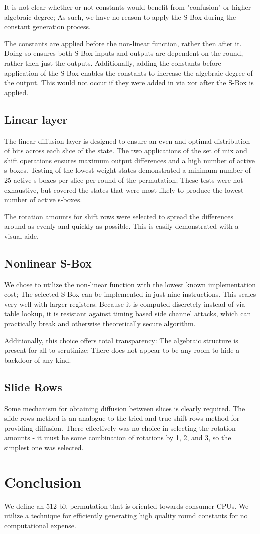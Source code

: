 \documentclass[preprint]{iacrtrans}
\begin{document}
It is not clear whether or not constants would  benefit from "confusion" or higher algebraic degree; As such, we have no reason to apply the S-Box during the constant generation process.

The constants are applied before the non-linear function, rather then after it. Doing so ensures both S-Box inputs and outputs are dependent on the round, rather then just the outputs. Additionally, adding the constants before application of the S-Box enables the constants to increase the algebraic degree of the output. This would not occur if they were added in via xor after the S-Box is applied.

\subsection{Linear layer}
The linear diffusion layer is designed to ensure an even and optimal distribution of bits across each slice of the state. The two applications of the set of mix and shift operations ensures maximum output differences and a high number of active s-boxes. Testing of the lowest weight states demonstrated a minimum number of 25 active s-boxes per slice per round of the permutation; These tests were not exhaustive, but covered the states that were most likely to produce the lowest number of active s-boxes.

The rotation amounts for shift rows were selected to spread the differences around as evenly and quickly as possible. This is easily demonstrated with a visual aide. 

\subsection{Nonlinear S-Box}   %
We chose to utilize the non-linear function with the lowest known implementation cost; The selected S-Box can be implemented in just nine instructions. This scales very well with larger registers. Because it is computed discretely instead of via table lookup, it is resistant against timing based side channel attacks, which can practically break and otherwise theoretically secure algorithm.

Additionally, this choice offers total transparency: The algebraic structure is present for all to scrutinize; There does not appear to be any room to hide a backdoor of any kind.

\subsection{Slide Rows}
Some mechanism for obtaining diffusion between slices is clearly required. The slide rows method is an analogue to the tried and true shift rows method for providing diffusion. There effectively was no choice in selecting the rotation amounts - it must be some combination of rotations by 1, 2, and 3, so the simplest one was selected.

\section{Conclusion}
 We define an 512-bit permutation that is oriented towards consumer CPUs. We utilize a technique for efficiently generating high quality round constants for no computational expense.
\end{document}
